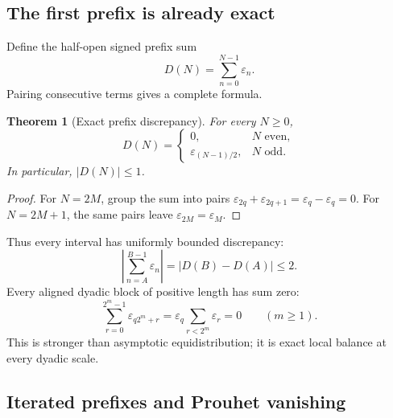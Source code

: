 \documentclass[11pt,oneside]{article}
\newtheorem{theorem}{Theorem}[section]
\theoremstyle{definition}
\theoremstyle{remark}
\newcommand{\eps}{\varepsilon}
\begin{document}
\subsection{The first prefix is already exact}

Define the half-open signed prefix sum
\begin{equation}
  D(N)=\sum_{n=0}^{N-1}\eps_n.                              \label{eq:D-prefix}
\end{equation}
Pairing consecutive terms gives a complete formula.

\begin{theorem}[Exact prefix discrepancy]
\label{thm:exact-prefix}
For every \(N\ge0\),
\begin{equation}
  \boxed{
  D(N)=
  \begin{cases}
    0,&N\text{ even},\\
    \eps_{(N-1)/2},&N\text{ odd}.
  \end{cases}}                                             \label{eq:exact-prefix}
\end{equation}
In particular, \(|D(N)|\le1\).
\end{theorem}

\begin{proof}
For \(N=2M\), group the sum into pairs
\(\eps_{2q}+\eps_{2q+1}=\eps_q-\eps_q=0\).  For \(N=2M+1\), the same pairs leave
\(\eps_{2M}=\eps_M\).
\end{proof}

Thus every interval has uniformly bounded discrepancy:
\begin{equation}
  \left|\sum_{n=A}^{B-1}\eps_n\right|
  =|D(B)-D(A)|\le2.                                        \label{eq:interval-discrepancy}
\end{equation}
Every aligned dyadic block of positive length has sum zero:
\begin{equation}
  \sum_{r=0}^{2^m-1}\eps_{q2^m+r}
  =\eps_q\sum_{r<2^m}\eps_r=0\qquad(m\ge1).               \label{eq:aligned-block-zero}
\end{equation}
This is stronger than asymptotic equidistribution; it is exact local balance at every dyadic
scale.

\subsection{Iterated prefixes and Prouhet vanishing}
\end{document}
